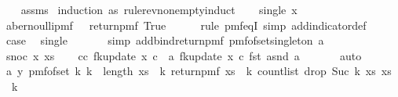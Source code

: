 \begin{isabellebody}
%
\isadelimproof
\ \ %
\endisadelimproof
%
\isatagproof
{}\isamarkupfalse%
\ assms\isanewline
{}\isamarkupfalse%
\ {\isacharparenleft}{\kern0pt}induction\ as\ rule{\isacharcolon}{\kern0pt}rev{\isacharunderscore}{\kern0pt}nonempty{\isacharunderscore}{\kern0pt}induct{\isacharparenright}{\kern0pt}\isanewline
\ \ \isamarkupfalse%
\ {\isacharparenleft}{\kern0pt}single\ x{\isacharparenright}{\kern0pt}\isanewline
\ \ \isamarkupfalse%
\ a{\isacharcolon}{\kern0pt}{\isachardoublequoteopen}bernoulli{\isacharunderscore}{\kern0pt}pmf\ {}\ {\isacharequal}{\kern0pt}\ return{\isacharunderscore}{\kern0pt}pmf\ True{\isachardoublequoteclose}\isanewline
\ \ \ \ \isamarkupfalse%
\ {\isacharparenleft}{\kern0pt}rule\ pmf{\isacharunderscore}{\kern0pt}eqI{\isacharcomma}{\kern0pt}\ simp\ add{\isacharcolon}{\kern0pt}indicator{\isacharunderscore}{\kern0pt}def{\isacharparenright}{\kern0pt}\isanewline
\ \ \isamarkupfalse%
\ {\isacharquery}{\kern0pt}case\ \isamarkupfalse%
\ single\ \isanewline
\ \ \ \ \isamarkupfalse%
\ {\isacharparenleft}{\kern0pt}simp\ add{\isacharcolon}{\kern0pt}bind{\isacharunderscore}{\kern0pt}return{\isacharunderscore}{\kern0pt}pmf\ pmf{\isacharunderscore}{\kern0pt}of{\isacharunderscore}{\kern0pt}set{\isacharunderscore}{\kern0pt}singleton\ a{\isacharparenright}{\kern0pt}\ \isanewline
{}\isamarkupfalse%
\isanewline
\ \ \isamarkupfalse%
\ {\isacharparenleft}{\kern0pt}snoc\ x\ xs{\isacharparenright}{\kern0pt}\isanewline
\ \ \isamarkupfalse%
\ c{\isacharcolon}{\kern0pt}{\isachardoublequoteopen}{\isasymAnd}c{\isachardot}{\kern0pt}\ fk{\isacharunderscore}{\kern0pt}update{\isacharprime}{\kern0pt}{\isacharprime}{\kern0pt}\ x\ c\ {\isacharequal}{\kern0pt}\ {\isacharparenleft}{\kern0pt}{\isasymlambda}a{\isachardot}{\kern0pt}\ fk{\isacharunderscore}{\kern0pt}update{\isacharprime}{\kern0pt}{\isacharprime}{\kern0pt}\ x\ c\ {\isacharparenleft}{\kern0pt}fst\ a{\isacharcomma}{\kern0pt}snd\ a{\isacharparenright}{\kern0pt}{\isacharparenright}{\kern0pt}{\isachardoublequoteclose}\ \isanewline
\ \ \ \ \isamarkupfalse%
\ auto\isanewline
\ \ \isamarkupfalse%
\ a{\isacharcolon}{\kern0pt}\ {\isachardoublequoteopen}{\isasymAnd}y{\isachardot}{\kern0pt}\ pmf{\isacharunderscore}{\kern0pt}of{\isacharunderscore}{\kern0pt}set\ {\isacharbraceleft}{\kern0pt}k{\isachardot}{\kern0pt}\ k\ {\isacharless}{\kern0pt}\ length\ xs{\isacharbraceright}{\kern0pt}\ {\isasymbind}\ {\isacharparenleft}{\kern0pt}{\isasymlambda}k{\isachardot}{\kern0pt}\ return{\isacharunderscore}{\kern0pt}pmf\ {\isacharparenleft}{\kern0pt}xs\ {\isacharbang}{\kern0pt}\ k{\isacharcomma}{\kern0pt}\ count{\isacharunderscore}{\kern0pt}list\ {\isacharparenleft}{\kern0pt}drop\ {\isacharparenleft}{\kern0pt}Suc\ k{\isacharparenright}{\kern0pt}\ xs{\isacharparenright}{\kern0pt}\ {\isacharparenleft}{\kern0pt}xs\ {\isacharbang}{\kern0pt}\ k{\isacharparenright}{\kern0pt}{\isacharparenright}{\kern0pt}\ {\isasymbind}\isanewline

\end{isabellebody}
